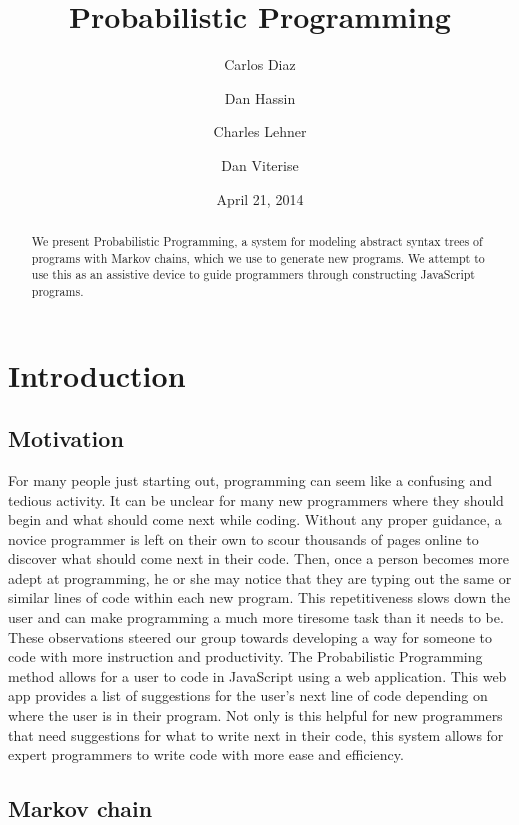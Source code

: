 \documentclass{article}
\title{
Probabilistic Programming
}
\author{
	Carlos Diaz
	\and
	Dan Hassin
	\and
	Charles Lehner
	\and
	Dan Viterise
}
\date{April 21, 2014}
\begin{document}
\maketitle

\begin{abstract}
	We present Probabilistic Programming, a system for modeling abstract syntax
	trees of programs with Markov chains, which we use to generate new programs.
	We attempt to use this as an assistive device to guide programmers through
	constructing JavaScript programs.
\end{abstract}

\section{Introduction}

\subsection{Motivation}

For many people just starting out, programming can seem like a confusing and
tedious activity. It can be unclear for many new programmers where they should
begin and what should come next while coding. Without any proper guidance, a
novice programmer is left on their own to scour thousands of pages online to
discover what should come next in their code. Then, once a person becomes more
adept at programming, he or she may notice that they are typing out the same or
similar lines of code within each new program. This repetitiveness slows down
the user and can make programming a much more tiresome task than it needs to be.
These observations steered our group towards developing a way for someone to
code with more instruction and productivity. The Probabilistic Programming
method allows for a user to code in JavaScript using a web application. This web
app provides a list of suggestions for the user's next line of code depending on
where the user is in their program. Not only is this helpful for new programmers
that need suggestions for what to write next in their code, this system allows
for expert programmers to write code with more ease and efficiency.

\subsection{Markov chain}
\end{document}
